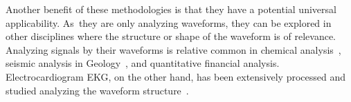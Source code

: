\documentclass[brainsci,article,accept,moreauthors,pdftex,10pt,a4paper]{mdpi}
\begin{document}

Another benefit of these methodologies is that they have a potential universal applicability.  As~they are only analyzing waveforms, they can be explored in other disciplines where the structure or shape of the waveform is of relevance.  Analyzing signals by their waveforms is relative common in chemical analysis~\citep{Skoog2000}, seismic analysis in Geology~\citep{Owens1984}, and quantitative financial analysis.  Electrocardiogram EKG, on the other hand, has been extensively processed and studied analyzing the waveform structure~\citep{Stockman1976}.


%
%
%
%



\vspace{6pt} 

\end{document}
